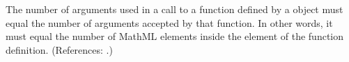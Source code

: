 The number of arguments used in a call to a function defined by a
\FunctionDefinition object must equal the number of arguments accepted by
that function.  In other words, it must equal the number of MathML
 elements inside the  element of the function
definition.  (References: .)
